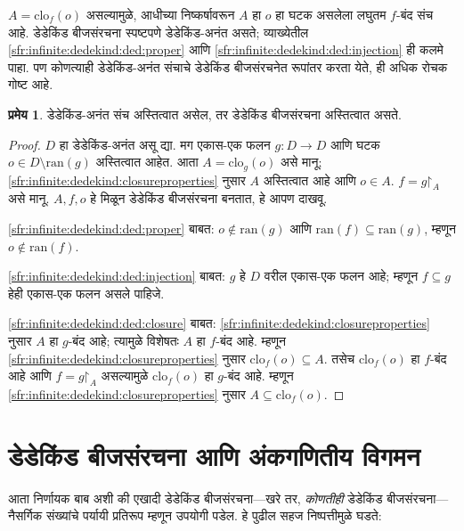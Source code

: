 \documentclass[11pt,a4paper,openany]{book}
\theoremstyle{definition}
\newtheorem{thm}[defn]{प्रमेय}
\newcommand{\funrestrictionto}[2]{#1\mathord{\restriction}_{#2}}
\newcommand{\ran}[1]{\mathrm{ran}(#1)}
\newcommand{\closureofunder}[2]{\mathrm{clo}_{#1}(#2)}
\begin{document}
$A = \closureofunder{f}{o}$ असल्यामुळे, आधीच्या निष्कर्षावरून $A$ हा
$o$ हा घटक असलेला लघुतम $f$-बंद संच आहे. डेडेकिंड बीजसंरचना
स्पष्टपणे डेडेकिंड-अनंत असते; व्याख्येतील \ref{sfr:infinite:dedekind:ded:proper} आणि
\ref{sfr:infinite:dedekind:ded:injection} ही कलमे पाहा. पण कोणत्याही डेडेकिंड-अनंत संचाचे
डेडेकिंड बीजसंरचनेत रूपांतर करता येते, ही अधिक रोचक गोष्ट आहे.

\begin{thm}\label{sfr:infinite:dedekind:thm:DedekindInfiniteAlgebra}
डेडेकिंड-अनंत संच अस्तित्वात असेल, तर डेडेकिंड बीजसंरचना अस्तित्वात असते.
\end{thm}

\begin{proof}
$D$ हा डेडेकिंड-अनंत असू द्या. मग एकास-एक फलन $g \colon D \to D$
आणि घटक $o  \in D \setminus \ran{g}$ अस्तित्वात आहेत. आता $A =
\closureofunder{g}{o}$ असे मानू; \ref{sfr:infinite:dedekind:closureproperties} नुसार $A$
अस्तित्वात आहे आणि $o \in A$. $f = \funrestrictionto{g}{A}$ असे मानू.
$A, f, o$ हे मिळून डेडेकिंड बीजसंरचना बनतात, हे आपण दाखवू.

\ref{sfr:infinite:dedekind:ded:proper} बाबत: $o \notin \ran{g}$ आणि $\ran{f}
\subseteq \ran{g}$, म्हणून $o\notin \ran{f}$.

\ref{sfr:infinite:dedekind:ded:injection} बाबत: $g$ हे $D$ वरील एकास-एक फलन आहे; म्हणून
$f \subseteq g$ हेही एकास-एक फलन असले पाहिजे.

\ref{sfr:infinite:dedekind:ded:closure} बाबत: \ref{sfr:infinite:dedekind:closureproperties} नुसार $A$ हा
$g$-बंद आहे; त्यामुळे विशेषतः $A$ हा $f$-बंद आहे. म्हणून
\ref{sfr:infinite:dedekind:closureproperties} नुसार $\closureofunder{f}{o} \subseteq A$.
तसेच $\closureofunder{f}{o}$ हा $f$-बंद आहे आणि
$f = \funrestrictionto{g}{A}$ असल्यामुळे $\closureofunder{f}{o}$ हा
$g$-बंद आहे. म्हणून \ref{sfr:infinite:dedekind:closureproperties} नुसार
$A \subseteq \closureofunder{f}{o}$.
\end{proof}








\section{डेडेकिंड बीजसंरचना आणि अंकगणितीय विगमन}\label{sfr:infinite:induction:sec}

आता निर्णायक बाब अशी की एखादी डेडेकिंड बीजसंरचना---खरे तर,
\emph{कोणतीही} डेडेकिंड बीजसंरचना---नैसर्गिक संख्यांचे पर्यायी प्रतिरूप
म्हणून उपयोगी पडेल. हे पुढील सहज निष्पत्तीमुळे घडते:
\end{document}
